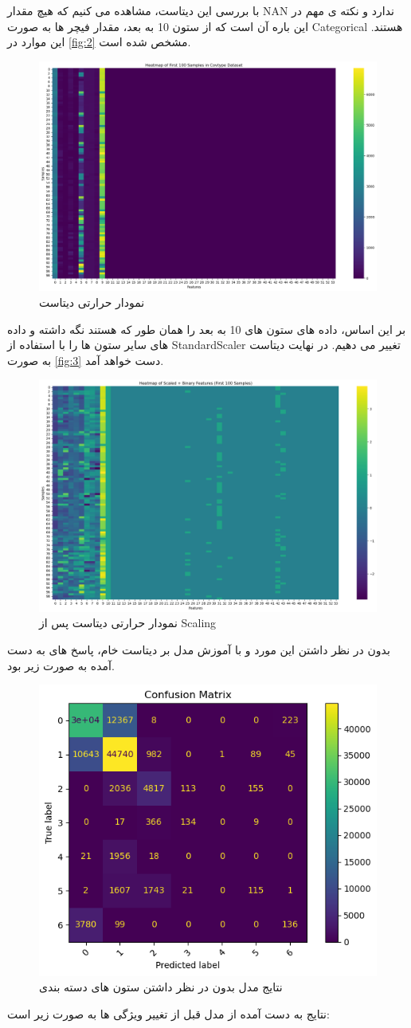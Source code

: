 \documentclass{article}
\begin{document}
با بررسی این دیتاست، مشاهده می کنیم که هیچ مقدار NAN ندارد و نکته ی مهم در این باره آن است که از ستون 10 به بعد، مقدار فیچر ها به صورت Categorical هستند. این موارد در \autoref{fig:2} مشخص شده است.
\begin{figure}[h!]
	\centering
	\includegraphics[width=0.7\linewidth]{2}
	\caption[]{نمودار حرارتی دیتاست}
	\label{fig:2}
\end{figure}
\clearpage
بر این اساس، داده های ستون های 10 به بعد را همان طور که هستند نگه داشته و داده های سایر ستون ها را با استفاده از StandardScaler تغییر می دهیم. در نهایت دیتاست به صورت \autoref{fig:3} دست خواهد آمد.
\begin{figure}[h!]
	\centering
	\includegraphics[width=0.7\linewidth]{3}
	\caption[]{نمودار حرارتی دیتاست پس از Scaling}
	\label{fig:3}
\end{figure}
\clearpage
بدون در نظر داشتن این مورد و با آموزش مدل بر دیتاست خام، پاسخ های به دست آمده به صورت زیر بود.
\begin{figure}[h!]
	\centering
	\includegraphics[width=0.7\linewidth]{4}
	\caption[]{نتایج مدل بدون در نظر داشتن ستون های دسته بندی}
	\label{fig:4}
\end{figure}
\clearpage
نتایج به دست آمده از مدل قبل از تغییر ویژگی ها به صورت زیر است:
\end{document}
